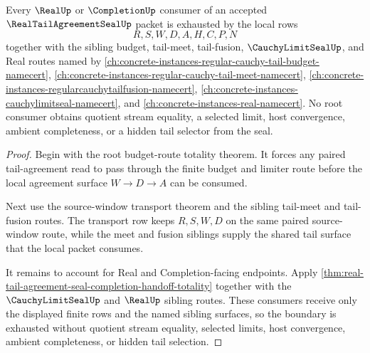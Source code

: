 \begin{theorem}
\label{thm:real-tail-agreement-seal-root-completion-boundary-exhaustion}
Every $\RealUp$ or $\CompletionUp$ consumer of an accepted $\RealTailAgreementSealUp$ packet is exhausted by the local rows
$$
R,S,W,D,A,H,C,P,N
$$
together with the sibling budget, tail-meet, tail-fusion, $\CauchyLimitSealUp$, and Real routes named by \autoref{ch:concrete-instances-regular-cauchy-tail-budget-namecert}, \autoref{ch:concrete-instances-regular-cauchy-tail-meet-namecert}, \autoref{ch:concrete-instances-regularcauchytailfusion-namecert}, \autoref{ch:concrete-instances-cauchylimitseal-namecert}, and \autoref{ch:concrete-instances-real-namecert}. No root consumer obtains quotient stream equality, a selected limit, host convergence, ambient completeness, or a hidden tail selector from the seal.
\end{theorem}
\begin{proof}
Begin with the root budget-route totality theorem. It forces any paired tail-agreement read to pass through the finite budget and limiter route before the local agreement surface $W \to D \to A$ can be consumed.

Next use the source-window transport theorem and the sibling tail-meet and tail-fusion routes. The transport row keeps $R,S,W,D$ on the same paired source-window route, while the meet and fusion siblings supply the shared tail surface that the local packet consumes.

It remains to account for Real and Completion-facing endpoints. Apply \autoref{thm:real-tail-agreement-seal-completion-handoff-totality} together with the $\CauchyLimitSealUp$ and $\RealUp$ sibling routes. These consumers receive only the displayed finite rows and the named sibling surfaces, so the boundary is exhausted without quotient stream equality, selected limits, host convergence, ambient completeness, or hidden tail selection.
\end{proof}

